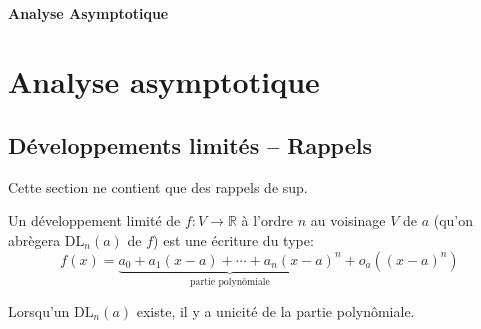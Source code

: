 \ifsolo
    ~

    \vspace{1cm}

    \begin{center}
        \textbf{\LARGE Analyse Asymptotique} \\[1em]
    \end{center}
    \tableofcontents
\else
    \chapter{Analyse asymptotique}

    \minitoc
\fi
\thispagestyle{empty}

\ifsolo \newpage \setcounter{page}{1} \fi
\section{Développements limités -- Rappels}

Cette section ne contient que des rappels de sup.

\begin{dfn}
    Un développement limité de $f:V\longrightarrow \mathbb R$ à l'ordre $n$ au voisinage $V$ de $a$ (qu'on abrègera $\mathrm{DL}_n(a)$ de $f$) est une écriture du type: \[
        f(x)=\underbrace{a_0+a_1(x-a)+\cdots +a_n(x-a)^n}_{\text{partie polynômiale}}+o_a((x-a)^n)
    \]
\end{dfn}

\begin{rem}
    Lorsqu'un $\mathrm{DL}_n(a)$ existe, il y a unicité de la partie polynômiale.
\end{rem}

